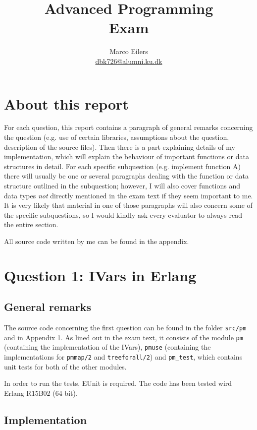 \documentclass[a4paper]{article}
\title{Advanced Programming\\
Exam}
\author{Marco Eilers\\ \url{dbk726@alumni.ku.dk} }
\begin{document}
\maketitle

\section*{About this report}
For each question, this report contains a paragraph of general remarks concerning the question (e.g. use of certain libraries, assumptions about the question, description of the source files). Then there is a part explaining details of my implementation, which will explain the behaviour of important functions or data structures in detail. For each specific subquestion (e.g. implement function A) there will usually be one or several paragraphs dealing with the function or data structure outlined in the subquestion; however, I will also cover functions and data types \emph{not} directly mentioned in the exam text if they seem important to me. It is very likely that material in one of those paragraphs will also concern some of the specific subquestions, so I would kindly ask every evaluator to always read the entire section.

All source code written by me can be found in the appendix.

\section*{Question 1: IVars in Erlang}

\subsection*{General remarks}
The source code concerning the first question can be found in the folder \texttt{src/pm} and in Appendix 1. As lined out in the exam text, it consists of the module \texttt{pm} (containing the implementation of the IVars), \texttt{pmuse} (containing the implementations for \texttt{pmmap/2} and \texttt{treeforall/2}) and \texttt{pm\_test}, which contains unit tests for both of the other modules. 

In order to run the tests, EUnit is required. The code has been tested wird Erlang R15B02 (64 bit).

\subsection*{Implementation}
\end{document}
